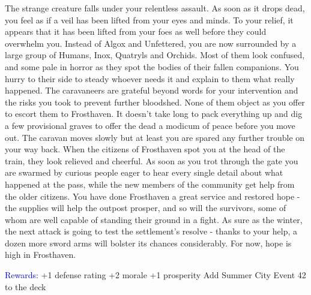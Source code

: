 \documentclass[fontsize=11pt]{scrartcl}
\begin{document}
\begin{multicols*}{3}
\begin{center}
		\end{center}
		\footnotesize{The strange creature falls under your relentless assault. As soon as it drops dead, you feel as if a veil has been lifted from your eyes and minds. To your relief, it appears that it has been lifted from your foes as well before they could overwhelm you. Instead of Algox and Unfettered, you are now surrounded by a large group of Humans, Inox, Quatryls and Orchids. Most of them look confused, and some pale in horror as they spot the bodies of their fallen companions. You hurry to their side to steady whoever needs it and explain to them what really happened. The caravaneers are grateful beyond words for your intervention and the risks you took to prevent further bloodshed. None of them object as you offer to escort them to Frosthaven. It doesn’t take long to pack everything up and dig a few provisional graves to offer the dead a modicum of peace before you move out.\newline\newline
The caravan moves slowly but at least you are spared any further trouble on your way back. When the citizens of Frosthaven spot you at the head of the train, they look relieved and cheerful. As soon as you trot through the gate you are swarmed by curious people eager to hear every single detail about what happened at the pass, while the new members of the community get help from the older citizens. You have done Frosthaven a great service and restored hope - the supplies will help the outpost prosper, and so will the survivors, some of whom are well capable of standing their ground in a fight. As sure as the winter, the next attack is going to test the settlement’s resolve - thanks to your help, a dozen more sword arms will bolster its chances considerably. For now, hope is high in Frosthaven.}
		\begin{center}
		  {\myfont\normalsize{\textcolor{Blue}{Rewards:}}}\newline
		  \footnotesize{+1 defense rating\newline
+2 morale\newline
+1 prosperity\newline
Add Summer City Event 42 to the deck}
		\end{center}
	\end{multicols*}
\end{document}
